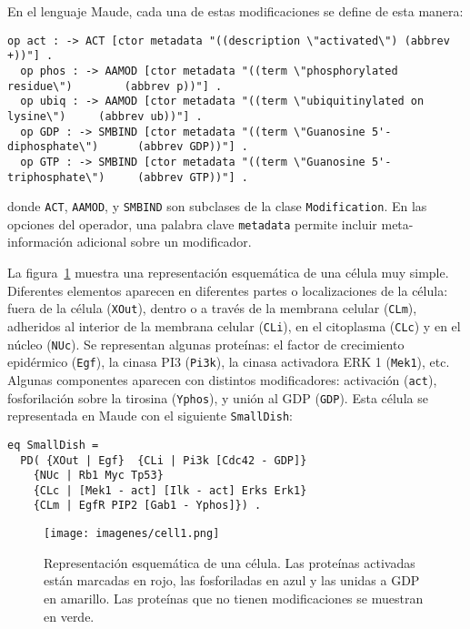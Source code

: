 En el lenguaje Maude, cada una de estas modificaciones se define de esta manera: 

\begin{lstlisting}[language=Maude,caption={Definición de las modificaciones en Maude},label=lst:DefinitionModifications]
  op act : -> ACT [ctor metadata "((description \"activated\") (abbrev +))"] .
  op phos : -> AAMOD [ctor metadata "((term \"phosphorylated residue\")        (abbrev p))"] . 
  op ubiq : -> AAMOD [ctor metadata "((term \"ubiquitinylated on lysine\")     (abbrev ub))"] . 
  op GDP : -> SMBIND [ctor metadata "((term \"Guanosine 5'-diphosphate\")      (abbrev GDP))"] .
  op GTP : -> SMBIND [ctor metadata "((term \"Guanosine 5'-triphosphate\")     (abbrev GTP))"] .
\end{lstlisting}

\noindent%
donde \texttt{ACT}, \texttt{AAMOD}, y \texttt{SMBIND} son subclases de la clase \texttt{Modification}. En las opciones del operador, una palabra clave \texttt{metadata} permite incluir meta-información adicional sobre un modificador. 
\medskip

La figura~\ref{fig:diagramdish1} muestra una representación esquemática de una célula muy simple. Diferentes elementos aparecen en diferentes partes o localizaciones de la célula: fuera de la célula (\texttt{XOut}), dentro o a través de la membrana celular (\texttt{CLm}), adheridos al interior de la membrana celular (\texttt{CLi}), en el citoplasma (\texttt{CLc}) y en el núcleo (\texttt{NUc}). Se representan algunas proteínas: el factor de crecimiento epidérmico (\texttt{Egf}), la cinasa PI3 (\texttt{Pi3k}), la cinasa activadora ERK 1 (\texttt{Mek1}), etc. Algunas componentes aparecen con distintos modificadores: activación (\texttt{act}), fosforilación sobre la tirosina (\texttt{Yphos}), y unión al GDP (\texttt{GDP}). Esta célula se representada en Maude con el siguiente \texttt{SmallDish}:

\begin{lstlisting}[language=Maude,caption={Placa de preparación \texttt{SmallDish}},label=lst:SmallDish]
eq SmallDish = 
  PD( {XOut | Egf}  {CLi | Pi3k [Cdc42 - GDP]}
    {NUc | Rb1 Myc Tp53}
    {CLc | [Mek1 - act] [Ilk - act] Erks Erk1}
    {CLm | EgfR PIP2 [Gab1 - Yphos]}) .
\end{lstlisting}

\begin{figure}[h!]
\centering
\texttt{[image: imagenes/cell1.png]}
\caption[Representación esquemática de una célula]{Representación esquemática de una célula. Las proteínas activadas están marcadas en rojo, las fosforiladas en azul y las unidas a GDP en amarillo. Las proteínas que no tienen modificaciones se muestran en verde.}
\label{fig:diagramdish1}
\end{figure}
\medskip


